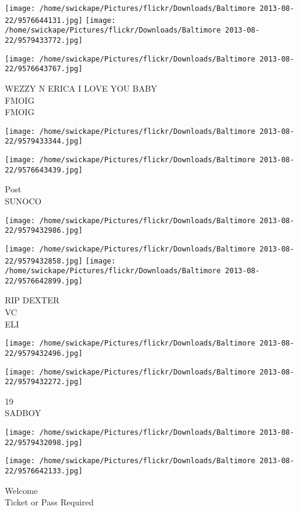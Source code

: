 \documentclass[10pt,letterpaper]{article}
\begin{document}
\texttt{[image: /home/swickape/Pictures/flickr/Downloads/Baltimore 2013-08-22/9576644131.jpg]}
\texttt{[image: /home/swickape/Pictures/flickr/Downloads/Baltimore 2013-08-22/9579433772.jpg]}

\vspace{0.25in}
\texttt{[image: /home/swickape/Pictures/flickr/Downloads/Baltimore 2013-08-22/9576643767.jpg]}

WEZZY N ERICA I LOVE YOU BABY\\
FMOIG\\
FMOIG
\pagebreak

\texttt{[image: /home/swickape/Pictures/flickr/Downloads/Baltimore 2013-08-22/9579433344.jpg]}

\vspace{0.25in}
\texttt{[image: /home/swickape/Pictures/flickr/Downloads/Baltimore 2013-08-22/9576643439.jpg]}

Post\\
SUNOCO
\pagebreak

\texttt{[image: /home/swickape/Pictures/flickr/Downloads/Baltimore 2013-08-22/9579432986.jpg]}

\vspace{0.25in}
\texttt{[image: /home/swickape/Pictures/flickr/Downloads/Baltimore 2013-08-22/9579432858.jpg]}
\texttt{[image: /home/swickape/Pictures/flickr/Downloads/Baltimore 2013-08-22/9576642899.jpg]}

RIP DEXTER\\
VC\\
ELI
\pagebreak

\texttt{[image: /home/swickape/Pictures/flickr/Downloads/Baltimore 2013-08-22/9579432496.jpg]}

\vspace{0.25in}
\texttt{[image: /home/swickape/Pictures/flickr/Downloads/Baltimore 2013-08-22/9579432272.jpg]}

19\\
SADBOY
\pagebreak

\texttt{[image: /home/swickape/Pictures/flickr/Downloads/Baltimore 2013-08-22/9579432098.jpg]}

\vspace{0.25in}
\texttt{[image: /home/swickape/Pictures/flickr/Downloads/Baltimore 2013-08-22/9576642133.jpg]}

Welcome\\
Ticket or Pass Required
\pagebreak
\end{document}
